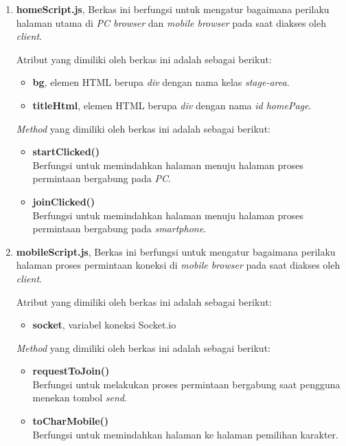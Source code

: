 \begin{enumerate}
\begin{enumerate}
\begin{enumerate}
			\item \textbf{homeScript.js}, Berkas ini berfungsi untuk mengatur bagaimana perilaku halaman utama di \textit{PC browser} dan \textit{mobile browser} pada saat diakses oleh \textit{client}.
			
			Atribut yang dimiliki oleh berkas ini adalah sebagai berikut:
			\begin{itemize}
				\item \textbf{bg}, elemen HTML berupa \textit{div} dengan nama kelas \textit{stage-area}.
				\item \textbf{titleHtml}, elemen HTML berupa \textit{div} dengan nama \textit{id homePage}.
			\end{itemize}
			
			\textit{Method} yang dimiliki oleh berkas ini adalah sebagai berikut:
			\begin{itemize}
				\item \textbf{startClicked()} \\
				Berfungsi untuk memindahkan halaman menuju halaman proses permintaan bergabung pada \textit{PC}.
				
				\item \textbf{joinClicked()} \\
				Berfungsi untuk memindahkan halaman menuju halaman proses permintaan bergabung pada \textit{smartphone}.
			\end{itemize}
			
			\item \textbf{mobileScript.js}, Berkas ini berfungsi untuk mengatur bagaimana perilaku halaman proses permintaan koneksi di \textit{mobile browser} pada saat diakses oleh \textit{client}.
			
			Atribut yang dimiliki oleh berkas ini adalah sebagai berikut:
			\begin{itemize}
				\item \textbf{socket}, variabel koneksi Socket.io
			\end{itemize}
			
			\textit{Method} yang dimiliki oleh berkas ini adalah sebagai berikut:
			\begin{itemize}
				\item \textbf{requestToJoin()} \\ 
				Berfungsi untuk melakukan proses permintaan bergabung saat pengguna menekan tombol \textit{send}.
				
				\item \textbf{toCharMobile()} \\
				Berfungsi untuk memindahkan halaman ke halaman pemilihan karakter.
			\end{itemize}
			

\end{enumerate}
\end{enumerate}
\end{enumerate}
